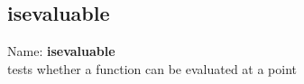 \subsection{isevaluable}
\label{labisevaluable}
\noindent Name: \textbf{isevaluable}\\
\phantom{aaa}tests whether a function can be evaluated at a point \\[0.2cm]
